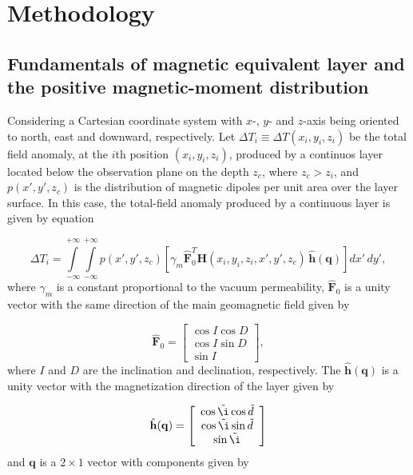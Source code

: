 \section{Methodology}
\label{sec:methodology}

\subsection{Fundamentals of magnetic equivalent layer and the positive magnetic-moment distribution}
\label{subsec:mag_eqlayer}

Considering a Cartesian coordinate system with $x$-, $y$- and $z$-axis being oriented to north, east and downward, respectively. Let $\Delta T_i \equiv \Delta T (x_i,y_i,z_i)$ be the total field anomaly, at the $i$th position $(x_i,y_i,z_i)$, produced by a continuos layer located below the observation plane on the depth $z_c$, where $z_c > z_i$, and $p(x',y',z_c)$ is the distribution of magnetic dipoles per unit area over the layer surface. In this case, the total-field anomaly produced by a continuous layer is given by equation 

\begin{equation}
\Delta T_i = \int \limits_{-\infty}^{+\infty } \int \limits_{-\infty}^{+\infty }  p(x',y',z_c)  [\gamma_m \hat{\mathbf{F}}_0^T \mathbf{H}(x_i,y_i,z_i,x',y',z_c) \,\hat{\mathbf{h}}(\mathbf{q})] dx' \,dy',
\label{eq:continuous_layer}
\end{equation}
where $\gamma_m$ is a constant proportional to the vacuum permeability, $\hat{\mathbf{F}}_0$ is a unity vector with the same direction of the main geomagnetic field given by

\begin{equation}
	\hat{\mathbf{F}}_0 =
	\left[ \begin{array}{c}
		 \cos I \cos D \\
		 \cos I \sin D \\
		 \sin I     
	\end{array} \right] ,
	\label{eq:main_field}
\end{equation}
where $I$ and $D$ are the inclination and declination, respectively. The $\hat{\mathbf{h}}(\mathbf{q})$ is a unity vector with the magnetization direction of the layer given by 

\begin{equation}
	\hat{\mathbf{h}}(\mathbf{q}) =
	\left[ \begin{array}{c}
		\cos \tilde{\i} \cos \tilde{d} \\
		\cos \tilde{\i} \sin \tilde{d}\\
		\sin \tilde{\i}
	\end{array} \right] 
	\label{eq:mag_vec}
\end{equation}
and $\mathbf{q}$ is a $2 \times 1$ vector with components given by 

